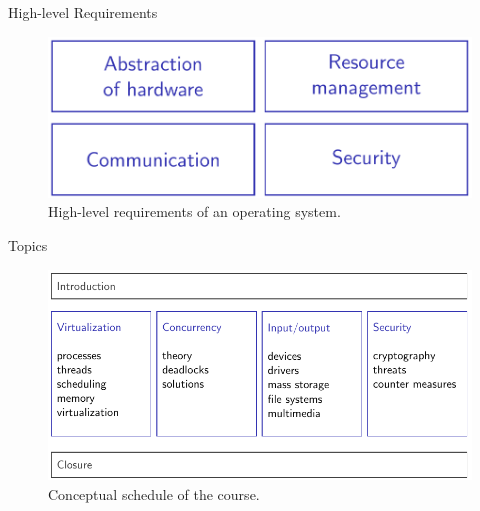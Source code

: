 \documentclass[10pt]{beamer}
\begin{document}
\begin{frame}{High-level Requirements}
\begin{figure}
       \begin{center}
       \includegraphics[keepaspectratio, width=\textwidth,height=0.9\textheight-4\baselineskip]{img/102_tasks.png}
      \end{center}
      \caption{High-level requirements of an operating system.~\autocite{mrupp}}
      \end{figure}
\end{frame}

\begin{frame}{Topics}
\begin{figure}
       \begin{center}
       \includegraphics[keepaspectratio, width=\textwidth,height=0.9\textheight-4\baselineskip]{img/103_schedule.png}
      \end{center}
      \caption{Conceptual schedule of the course.~\autocite{mrupp}}
      \end{figure}
\end{frame}
\end{document}
